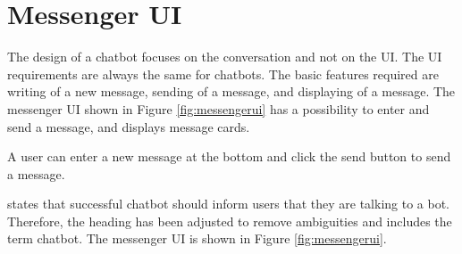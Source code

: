 \section{Messenger UI}
The design of a chatbot focuses on the conversation and not on the UI.
The UI requirements are always the same for chatbots.
The basic features required are writing of a new message, sending of a message, and displaying of a message.
The messenger UI shown in Figure \ref{fig:messengerui} has a possibility to enter and send 
a message, and displays message cards.

A user can enter a new message at the bottom and click the send button to send a message.


\citet{brandtzaeg2018chatbots} states that successful chatbot should inform users that they are talking to a bot.
Therefore, the heading has been adjusted to remove ambiguities and includes the term chatbot.
The messenger UI is shown in Figure \ref{fig:messengerui}. 


